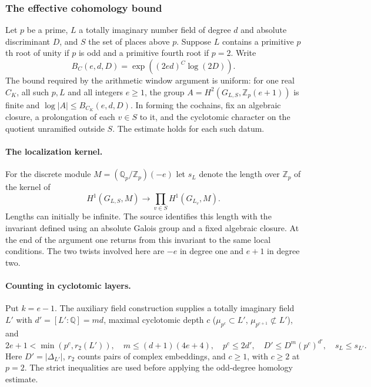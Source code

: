 \subsubsection{The effective cohomology bound}\label{tw:effectiveK}

Let $p$ be a prime, $L$ a totally imaginary number field of degree $d$ and
absolute discriminant $D$, and $S$ the set of places above $p$.
Suppose $L$ contains a primitive $p$th root of unity if $p$ is odd
and a primitive fourth root if $p=2$. Write
\[
 B_C(e,d,D)=\exp((2ed)^C\log(2D)).
\]
The bound required by the arithmetic window argument is uniform: for one
real $C_K$, all such $p,L$ and all integers $e\ge1$, the group
$A=H^2(G_{L,S},\mathbb Z_p(e+1))$ is finite and
$\log |A|\le B_{C_K}(e,d,D)$. In forming the cochains, fix an algebraic
closure, a prolongation of each $v\in S$ to it, and the cyclotomic
character on the quotient unramified outside $S$. The estimate holds for
each such datum.

\paragraph{The localization kernel.}
For the discrete module $M=(\mathbb Q_p/\mathbb Z_p)(-e)$ let
$s_L$ denote the length over $\mathbb Z_p$ of the kernel of
\[
 H^1(G_{L,S},M)\longrightarrow \prod_{v\in S} H^1(G_{L_v},M).
\]
Lengths can initially be infinite. The source identifies this length with
the invariant defined using an absolute Galois group and a fixed algebraic
closure. At the end of the argument one returns from this invariant to
the same local conditions. The two twists involved here are $-e$ in degree
one and $e+1$ in degree two.

\paragraph{Counting in cyclotomic layers.}
Put $k=e-1$. The auxiliary field construction supplies a totally imaginary
field $L'$ with $d'=[L':\mathbb Q]=m d$, maximal cyclotomic depth $c$
($\mu_{p^c}\subset L'$, $\mu_{p^{c+1}}\not\subset L'$), and
\[
 2e+1<\min(p^c,r_2(L')), \quad
 m\le(d+1)(4e+4), \quad p^c\le 2d',\quad
 D'\le D^m(p^c)^{d'},\quad s_L\le s_{L'}.
\]
Here $D'=|\Delta_{L'}|$, $r_2$ counts pairs of complex embeddings, and
$c\ge1$, with $c\ge2$ at $p=2$. The strict inequalities are used before
applying the odd-degree homology estimate.

